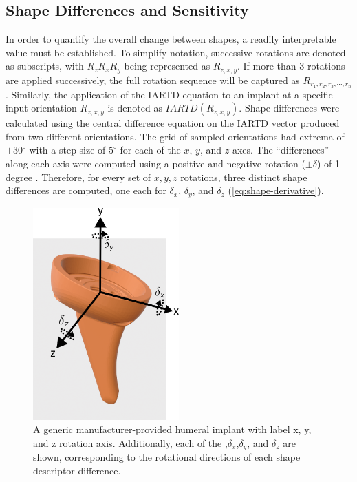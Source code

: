 \subsection{Shape Differences and Sensitivity}
In order to quantify the overall change between shapes, a readily interpretable value must be established.
To simplify notation, successive rotations are denoted as subscripts, with $R_{z}R_{x}R_{y}$ being represented as $R_{z,x,y}$.
If more than 3 rotations are applied successively, the full rotation sequence will be captured as $R_{r_{1},r_{2},r_{3},\cdots,r_{n}}$.
Similarly, the application of the IARTD equation to an implant at a specific input orientation $R_{z,x,y}$ is denoted as $IARTD(R_{z,x,y})$.
Shape differences were calculated using the central difference equation on the IARTD vector produced from two different orientations.
The grid of sampled orientations had extrema of $\pm 30^{\circ}$ with a step size of $5^{\circ}$ for each of the $x$, $y$, and $z$ axes.
The ``differences'' along each axis were computed using a positive and negative rotation ($\pm \delta $) of 1 degree .
Therefore, for every set of $x,y,z$ rotations, three distinct shape differences are computed, one each for $\delta_{x}$, $\delta_{y}$, and $\delta_{z}$ (\cref{eq:shape-derivative}).

\begin{figure}[h!]
  \centering
  \includegraphics[width=0.5\textwidth]{rTSA_humeral_rotation_axes.png}
  \caption{A generic manufacturer-provided humeral implant with label x, y, and z rotation axis. Additionally, each of the ,$\delta_x$,$\delta_y$, and $\delta_z$ are shown, corresponding to the rotational directions of each shape descriptor difference.}
  \label{fig:rot-axis}
\end{figure}

